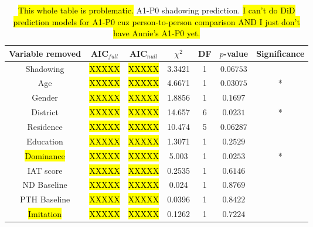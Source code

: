 \begin{table}
\centering
 \begin{tabular}{|c||c|c|c|c|c|c|} 
 \hline
 \textbf{Variable removed} & \textbf{AIC$_{full}$} & \textbf{AIC$_{null}$} & $\chi^2$ & \textbf{DF} & \textbf{$p$-value} & \textbf{Significance}\\ [0.5ex] 
 \hline
  Shadowing & \hl{XXXXX} & \hl{XXXXX} & 3.3421 & 1 & $0.06753$ & \\ 
 \hline
 Age & \hl{XXXXX} & \hl{XXXXX} & 4.6671 & 1 & $0.03075$ & *\\
 \hline
 Gender & \hl{XXXXX} & \hl{XXXXX} & 1.8856 & 1 & $0.1697$ & \\
 \hline
 District & \hl{XXXXX} & \hl{XXXXX} & 14.657 & 6 & $0.0231$ & *\\
 \hline
 Residence & \hl{XXXXX} & \hl{XXXXX} & 10.474 & 5 & $0.06287$ & \\
 \hline
 Education & \hl{XXXXX} & \hl{XXXXX} & 1.3071 & 1 & $0.2529$ & \\
 \hline
 \hl{Dominance} & \hl{XXXXX} & \hl{XXXXX} & 5.003 & 1 & $0.0253$ & *\\%
 \hline
 IAT score & \hl{XXXXX} & \hl{XXXXX} & 0.2535 & 1 & $0.6146$ & \\
 \hline
 ND Baseline & \hl{XXXXX} & \hl{XXXXX} & 0.024 & 1 & $0.8769$ & \\
 \hline
 PTH Baseline & \hl{XXXXX} & \hl{XXXXX} & 0.0396 & 1 & $0.8422$ & \\
 \hline
 \hl{Imitation} & \hl{XXXXX} & \hl{XXXXX} & 0.1262 & 1 & $0.7224$ & \\%
 \hline
\end{tabular}
\caption{\hl{This whole table is problematic.} A1-P0 shadowing prediction. \hl{I can't do DiD prediction models for A1-P0 cuz person-to-person comparison AND I just don't have Annie's A1-P0 yet.}}
\label{tab:NASshadPredictors}
\end{table}

